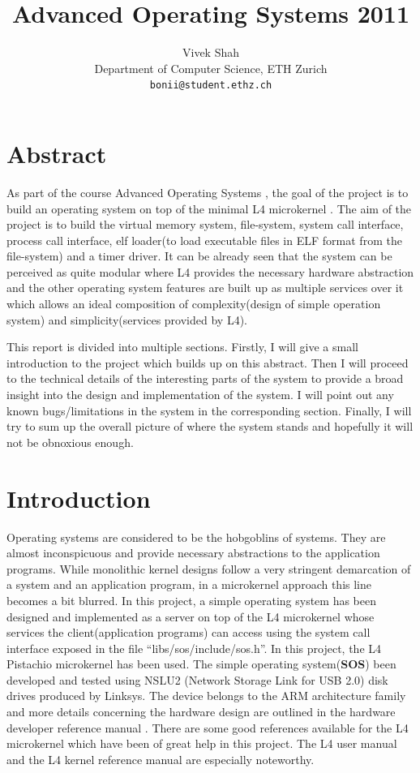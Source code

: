\documentclass[a4paper, 11pt]{article}
\title{Advanced Operating Systems 2011}
\author{Vivek Shah \\Department of Computer Science, ETH Zurich \\
\texttt{bonii@student.ethz.ch}}
\begin{document}
    
\maketitle
\newpage
\tableofcontents
\newpage

\section{Abstract}
As part of the course Advanced Operating Systems \cite{os-project},
the goal of the project is to build an operating system on top of the
minimal L4 microkernel \cite{l4}. The aim of the project is to build
the virtual memory system, file-system, system call interface, process
call interface, elf loader(to load executable files in ELF \cite{elf}
format from
the file-system) and a timer driver. It can be already seen that the
system can be perceived as quite modular where L4 provides the
necessary hardware abstraction and the other operating system features
are built up as multiple services over it which allows an ideal
composition of complexity(design of simple operation system) and
simplicity(services provided by L4). 

This report is divided into multiple sections. Firstly, I will give a
small introduction to the project which builds up on this
abstract. Then I will proceed to the technical details of the
interesting parts of the system to provide a broad insight into the
design and implementation of the system. I will point out any known
bugs/limitations in the system in the corresponding section. Finally,
I will try to sum up the overall picture of where the system stands
and hopefully it will not be obnoxious enough. 

\newpage
\section{Introduction}
Operating systems are considered to be the hobgoblins of systems. They
are almost inconspicuous and provide necessary abstractions to the application
programs. While monolithic kernel designs follow a very stringent
demarcation of a system and an application program, in a microkernel
approach this line becomes a bit blurred. In this project, a simple
operating system has been designed and implemented as a server on top
of the L4 microkernel whose services the client(application programs)
can access using the system call interface exposed in the file
``libs/sos/include/sos.h''.  In this project, the L4 Pistachio microkernel
\cite{l4-pistachio} has been used. The simple operating system({\bf SOS}) been
developed and tested using NSLU2 (Network Storage Link for USB 2.0)
disk drives \cite{slug} produced by Linksys. The device belongs to the
ARM architecture family \cite{arm-manual} and more details concerning
the hardware design are outlined in the hardware developer reference manual 
\cite{slug-manual}. There are some good references available for the
L4 microkernel which have been of great help in this project. The L4
user manual \cite{l4-usermanual} and the L4 kernel reference manual
\cite{l4-manual} are especially noteworthy.
\end{document}

